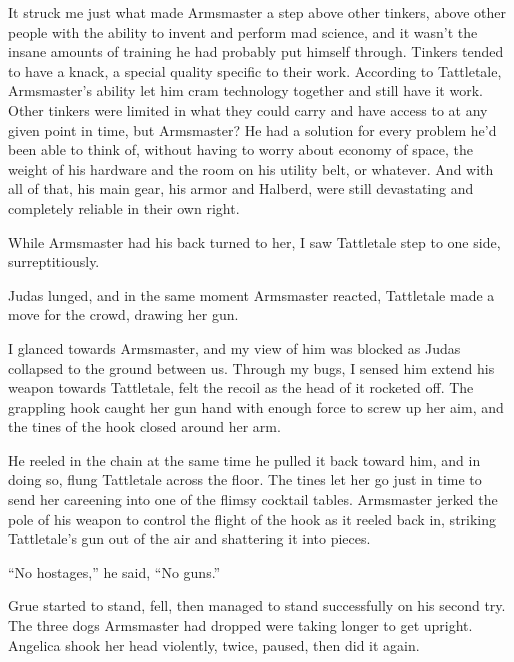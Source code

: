 It struck me just what made Armsmaster a step above other tinkers, above other people with the ability to invent and perform mad science, and it wasn't the insane amounts of training he had probably put himself through.  Tinkers tended to have a knack, a special quality specific to their work.  According to Tattletale, Armsmaster's ability let him cram technology together and still have it work.  Other tinkers were limited in what they could carry and have access to at any given point in time, but Armsmaster?  He had a solution for every problem he'd been able to think of, without having to worry about economy of space, the weight of his hardware and the room on his utility belt, or whatever.  And with all of that, his main gear, his armor and Halberd, were still devastating and completely reliable in their own right.



While Armsmaster had his back turned to her, I saw Tattletale step to one side, surreptitiously.



Judas lunged, and in the same moment Armsmaster reacted, Tattletale made a move for the crowd, drawing her gun.



I glanced towards Armsmaster, and my view of him was blocked as Judas collapsed to the ground between us.  Through my bugs, I sensed him extend his weapon towards Tattletale, felt the recoil as the head of it rocketed off.  The grappling hook caught her gun hand with enough force to screw up her aim, and the tines of the hook closed around her arm.



He reeled in the chain at the same time he pulled it back toward him, and in doing so, flung Tattletale across the floor.  The tines let her go just in time to send her careening into one of the flimsy cocktail tables.  Armsmaster jerked the pole of his weapon to control the flight of the hook as it reeled back in, striking Tattletale's gun out of the air and shattering it into pieces.



``No hostages,'' he said, ``No guns.''



Grue started to stand, fell, then managed to stand successfully on his second try.  The three dogs Armsmaster had dropped were taking longer to get upright.  Angelica shook her head violently, twice, paused, then did it again.



